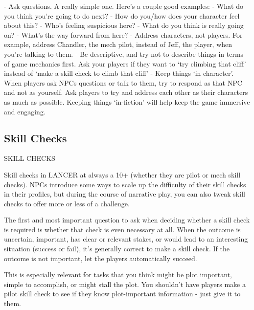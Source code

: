             -   Ask questions. A really simple one. Here’s a couple good examples:  
                     -   What do you think you’re going to do next?  
                     -   How do you/how does your character feel about this?  
                     -   Who’s feeling suspicious here?  
                     -   What do you think is really going on?  
                     -   What’s the way forward from here?   
            -   Address characters, not players. For example, address Chandler, the mech  
                 pilot, instead of Jeff, the player, when you’re talking to them.   
            -    Be descriptive, and try not to describe things in terms of game mechanics first.  
                Ask your players if they want to ‘try climbing that cliff’ instead of ‘make a skill  
                check to climb that cliff’  
            -    Keep things ‘in character’. When players ask NPCs questions or talk to them, try  
                to respond as that NPC and not as yourself. Ask players to try and address each  
                other as their characters as much as possible. Keeping things ‘in-fiction’ will help  
                 keep the game immersive and engaging.  

                                                                                                          
\subsection{Skill Checks}

                                           SKILL CHECKS  

Skill checks in LANCER at always a 10+ (whether they are pilot or mech skill checks). NPCs  
introduce some ways to scale up the difficulty of their skill checks in their profiles, but during the  
course of narrative play, you can also tweak skill checks to offer more or less of a challenge.
 

The first and most important question to ask when deciding whether a skill check is  
required is whether that check is even necessary at all. When the outcome is uncertain,  
important, has clear or relevant stakes, or would lead to an interesting situation (success or fail),  
it’s generally correct to make a skill check. If the outcome is not important, let the players  
automatically succeed.
 

This is especially relevant for tasks that you think might be plot important, simple to accomplish,  
or might stall the plot. You shouldn’t have players make a pilot skill check to see if they know  
plot-important information - just give it to them. 
 

